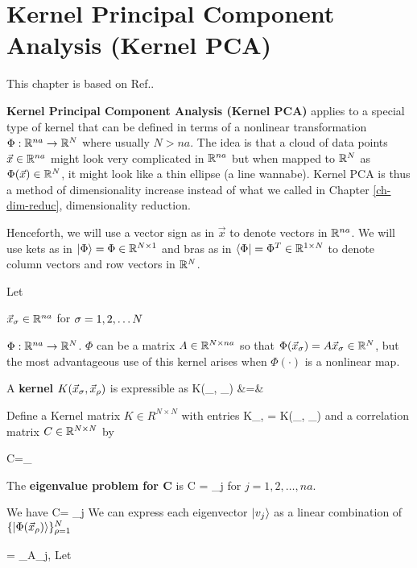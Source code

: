 \chapter{Kernel Principal Component Analysis (Kernel PCA)}
\label{ch-kernel-pca}

This chapter is based on Ref.\cite{wiki-kernel-pca}.

{\bf Kernel Principal Component Analysis (Kernel PCA)} applies
to a special type
of kernel that can be defined in terms of
a nonlinear transformation $\Phi:{ \mathbb{R}}^{na}\rightarrow { \mathbb{R}}^{N}$
where usually $N>na$. The idea is that a cloud of data points 
$\vec{x}\in{ \mathbb{R}}^{na}$ might look very complicated 
in ${ \mathbb{R}}^{na}$ but
when mapped to ${ \mathbb{R}}^N$ as $\Phi(\vec{x})\in{ \mathbb{R}}^N$, it might look like a thin ellipse (a line wannabe). Kernel PCA is thus a method of dimensionality increase instead of what
we called in Chapter \ref{ch-dim-reduc}, dimensionality
reduction.  

Henceforth, we will use a vector sign
as in $\vec{x}$ to denote 
vectors in ${ \mathbb{R}}^{na}$. We will use kets as in  $|\Phi\rangle=\Phi\in { \mathbb{R}}^{N\times 1}$ and bras as in $\langle\Phi|=\Phi^T\in { \mathbb{R}}^{1\times N}$ to denote  column vectors and row vectors in ${ \mathbb{R}}^N$.

Let

$\vec{x}_\sigma\in { \mathbb{R}}^{na}$ for  $\sigma=1,2,\ldots N$

$\Phi: { \mathbb{R}}^{na}\rightarrow { \mathbb{R}}^N$. $\Phi$ 
can be a matrix $A\in { \mathbb{R}}^{N\times na}$ so that $
\Phi (\vec{x}_\sigma)=A\vec{x}_\sigma\in{ \mathbb{R}}^N$,
but the most advantageous use of this
kernel arises when $\Phi(\cdot)$ is a nonlinear map.
 
A {\bf {} kernel} $K(\vec{x}_\sigma, \vec{x}_{\rho})$ is
expressible as
\beqa
K(_\s, _{\rho}) &=& 
\eeqa

Define a Kernel matrix $K\in R^{N\times N}$ with entries
\beq
K_{\s, \rho} = K(_\s, _{\rho})
\eeq
and a correlation matrix $C\in { \mathbb{R}}^{N\times N}$ by

\beqa
C=\sum_\s 
{}
\eeqa

The {\bf eigenvalue problem for C} is
\beq
C  = \lam_j 
\eeq
for $j=1,2, \ldots, na$.


We have
\beq
{} C=
\lam_j
\eeq
We can express each eigenvector $|v_j\rangle$
as a linear combination of  
$\{|\Phi(\vec{x}_\rho)\rangle\}_{\rho=1}^N$


\beq
{} = \sum_\rho A_{j,\rho}
\eeq
Let

